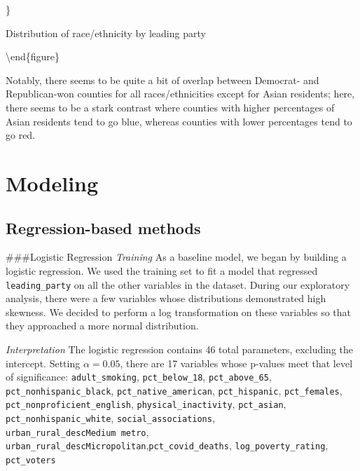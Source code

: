 \documentclass[
]{article}
\begin{document}
\}

\caption{Distribution of race/ethnicity by leading party}

\label{fig:race-plots}
\textbackslash end\{figure\}

Notably, there seems to be quite a bit of overlap between Democrat- and Republican-won counties for all races/ethnicities except for Asian residents; here, there seems to be a stark contrast where counties with higher percentages of Asian residents tend to go blue, whereas counties with lower percentages tend to go red.

\hypertarget{modeling}{%
\section{Modeling}\label{modeling}}

\hypertarget{regression-based-methods}{%
\subsection{Regression-based methods}\label{regression-based-methods}}

\#\#\#Logistic Regression
\emph{Training}
As a baseline model, we began by building a logistic regression. We used the training set to fit a model that regressed \texttt{leading\_party} on all the other variables in the dataset. During our exploratory analysis, there were a few variables whose distributions demonstrated high skewness. We decided to perform a log transformation on these variables so that they approached a more normal distribution.

\emph{Interpretation}
The logistic regression contains 46 total parameters, excluding the intercept. Setting \(\alpha = 0.05\), there are 17 variables whose p-values meet that level of significance:
\texttt{adult\_smoking}, \texttt{pct\_below\_18}, \texttt{pct\_above\_65}, \texttt{pct\_nonhispanic\_black}, \texttt{pct\_native\_american}, \texttt{pct\_hispanic}, \texttt{pct\_females}, \texttt{pct\_nonproficient\_english}, \texttt{physical\_inactivity}, \texttt{pct\_asian}, \texttt{pct\_nonhispanic\_white}, \texttt{social\_associations}, \texttt{urban\_rural\_descMedium\ metro}, \texttt{urban\_rural\_descMicropolitan},\texttt{pct\_covid\_deaths}, \texttt{log\_poverty\_rating}, \texttt{pct\_voters}
\end{document}
